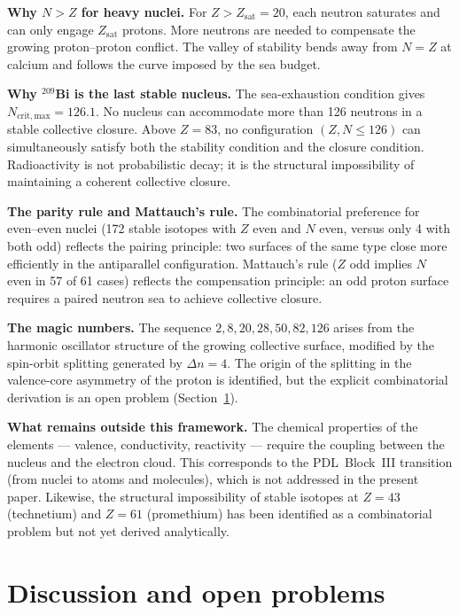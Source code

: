 \documentclass[11pt,a4paper]{article}
\theoremstyle{definition}
\newcommand{\PDL}{\textnormal{PDL}}
\newcommand{\Zsat}{Z_{\mathrm{sat}}}
\begin{document}
\medskip\noindent\textbf{Why $N > Z$ for heavy nuclei.} For $Z > \Zsat = 20$, each neutron saturates and can only engage $\Zsat$ protons. More neutrons are needed to compensate the growing proton--proton conflict. The valley of stability bends away from $N = Z$ at calcium and follows the curve imposed by the sea budget.

\medskip\noindent\textbf{Why ${}^{209}$Bi is the last stable nucleus.} The sea-exhaustion condition gives $N_{\mathrm{crit,max}} = 126.1$. No nucleus can accommodate more than 126 neutrons in a stable collective closure. Above $Z = 83$, no configuration $(Z, N \leq 126)$ can simultaneously satisfy both the stability condition and the closure condition. Radioactivity is not probabilistic decay; it is the structural impossibility of maintaining a coherent collective closure.

\medskip\noindent\textbf{The parity rule and Mattauch's rule.} The combinatorial preference for even--even nuclei (172 stable isotopes with $Z$ even and $N$ even, versus only 4 with both odd) reflects the pairing principle: two surfaces of the same type close more efficiently in the antiparallel configuration. Mattauch's rule ($Z$ odd implies $N$ even in 57 of 61 cases) reflects the compensation principle: an odd proton surface requires a paired neutron sea to achieve collective closure.

\medskip\noindent\textbf{The magic numbers.} The sequence $2, 8, 20, 28, 50, 82, 126$ arises from the harmonic oscillator structure of the growing collective surface, modified by the spin-orbit splitting generated by $\Delta n = 4$. The origin of the splitting in the valence-core asymmetry of the proton is identified, but the explicit combinatorial derivation is an open problem (Section~\ref{sec:discussion}).

\medskip\noindent\textbf{What remains outside this framework.} The chemical properties of the elements --- valence, conductivity, reactivity --- require the coupling between the nucleus and the electron cloud. This corresponds to the \PDL\ Block~III transition (from nuclei to atoms and molecules), which is not addressed in the present paper. Likewise, the structural impossibility of stable isotopes at $Z = 43$ (technetium) and $Z = 61$ (promethium) has been identified as a combinatorial problem but not yet derived analytically.

\section{Discussion and open problems}
\label{sec:discussion}
\end{document}
